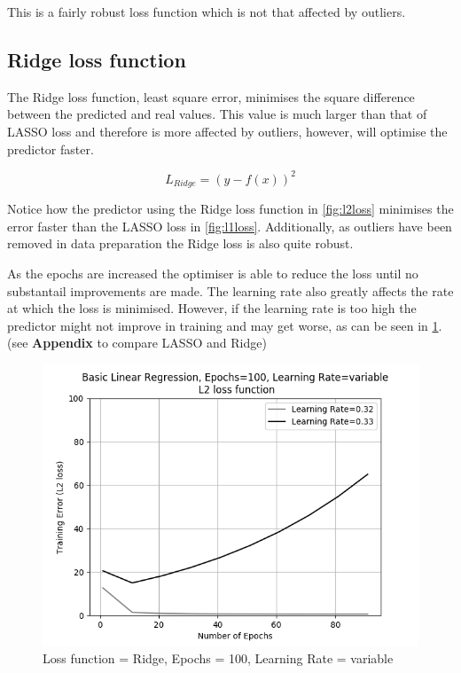 \documentclass[10pt,twocolumn,letterpaper]{article}
\begin{document}
This is a fairly robust loss function which is not that affected by outliers. 

\subsection{Ridge loss function}
The Ridge loss function, least square error, minimises the square difference between the predicted and real values. This value is much larger than that of LASSO loss and therefore is more affected by outliers, however, will optimise the predictor faster.

\begin{equation}
L_{Ridge} =  (y - f(x))^2
\label{eq:ridge}
\end{equation}

Notice how the predictor using the Ridge loss function in \ref{fig:l2loss} minimises the error faster than the LASSO loss in \ref{fig:l1loss}. Additionally, as outliers have been removed in data preparation the Ridge loss is also quite robust.

As the epochs are increased the optimiser is able to reduce the loss until no substantail improvements are made. The learning rate also greatly affects the rate at which the loss is minimised. However, if the learning rate is too high the predictor might not improve in training and may get worse, as can be seen in \ref{fig:break}. (see \textbf{Appendix} to compare LASSO and Ridge)

\begin{figure}[h]
	\begin{center}
		\includegraphics[width=0.8\linewidth]{img/linrbreak.png}
	\end{center}
	\caption{Loss function = Ridge, Epochs = 100, Learning Rate = variable}
	\label{fig:break}
\end{figure}
\end{document}
